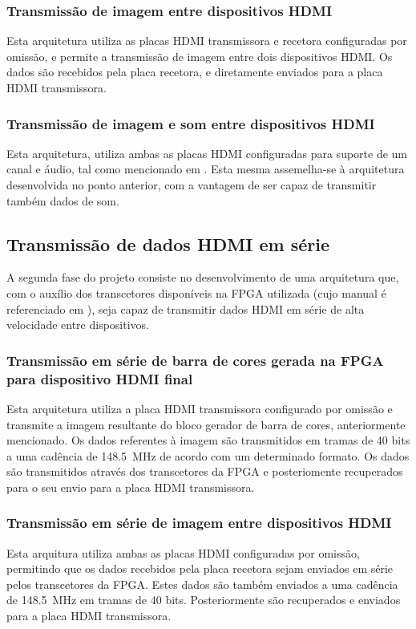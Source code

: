 \documentclass[a4paper]{IEEEtran}
\begin{document}
\subsubsection{Transmissão de imagem entre dispositivos HDMI}
Esta arquitetura utiliza as placas HDMI transmissora e recetora configuradas por omissão, e permite a transmissão de imagem entre dois dispositivos HDMI. Os dados são recebidos pela placa recetora, e diretamente enviados para a placa HDMI transmissora.

\subsubsection{Transmissão de imagem e som entre dispositivos HDMI}
Esta arquitetura, utiliza ambas as placas HDMI configuradas para suporte de um canal e áudio, tal como mencionado em \cite{R014}. Esta mesma assemelha-se à arquitetura desenvolvida no ponto anterior, com a vantagem de ser capaz de transmitir também dados de som.

\subsection{Transmissão de dados HDMI em série}
A segunda fase do projeto consiste no desenvolvimento de uma arquitetura que, com o auxílio dos transcetores disponíveis na FPGA utilizada (cujo manual é referenciado em \cite{R011}), seja capaz de transmitir dados HDMI em série de alta velocidade entre dispositivos.
\\
\subsubsection{Transmissão em série de barra de cores gerada na FPGA para dispositivo HDMI final}
Esta arquitetura utiliza a placa HDMI transmissora configurado por omissão e transmite a imagem resultante do bloco gerador de barra de cores, anteriormente mencionado. Os dados referentes à imagem são transmitidos em tramas de 40 bits a uma cadência de \SI{148.5}{\mega\hertz} de acordo com um determinado formato. Os dados são transmitidos através dos transcetores da FPGA e posteriomente recuperados para o seu envio para a placa HDMI transmissora.

\subsubsection{Transmissão em série de imagem entre dispositivos HDMI}
Esta arquitura utiliza ambas as placas HDMI configuradas por omissão, permitindo que os dados recebidos pela placa recetora sejam enviados em série pelos transcetores da FPGA. Estes dados são também enviados a uma cadência de \SI{148.5}{\mega\hertz} em tramas de 40 bits. Posteriormente são recuperados e enviados para a placa HDMI transmissora.
\end{document}
